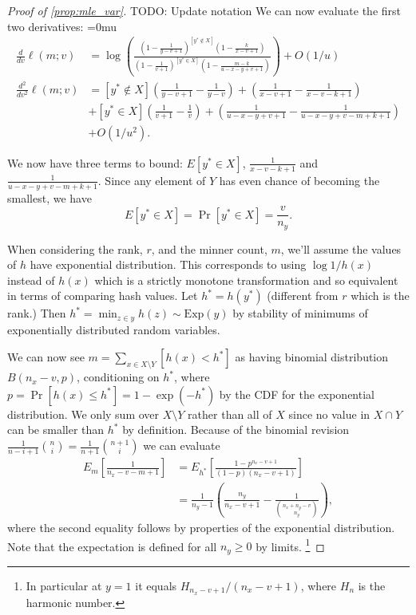 \begin{proof}[Proof of \cref{prop:mle_var}]
   TODO: Update notation
   We can now evaluate the first two derivatives:
   {
      \thinmuskip=0mu
      \begin{align}
         \frac{d}{dv}\ell(m;v)
         &=
         \log\left(\frac{(1-\frac1{y-v+1})^{[y^*\not\in X]}(1-\frac{k}{x-v+1})}{(1-\frac 1{v+1})^{[y^*\in X]}(1-\frac{m-k}{u-x-y+v+1})}\right) + O(1/u)
         \label{eq:deriv1}
         \\
         \frac{d^2}{dv^2}\ell(m;v)
        &=
          [y^*\not\in X](\tfrac1{y-v+1}-\tfrac1{y-v})
         + (\tfrac1{x-v+1}-\tfrac1{x-v-k+1})
      \\&+[y^*\in X](\tfrac1{v+1}-\tfrac1{v})
         + (\tfrac1{u-x-y+v+1}-\tfrac1{u-x-y+v-m+k+1})
      \\&+ O(1/u^2)
         \label{eq:deriv2}
         .
      \end{align}
      \vspace{-1em}
   }

   We now have three terms to bound:
   $E[y^* \in X]$, $\tfrac1{x-v-k+1}$ and $\tfrac1{u-x-y+v-m+k+1}$.
   Since any element of $Y$ has even chance of becoming the smallest, we have 
   \[E[y^*\in X] = \Pr[y^*\in X] = \frac{v}{n_y}. \]

   When considering the rank, $r$, and the minner count, $m$, we'll assume the values of $h$ have exponential distribution.
   This corresponds to using $\log1/h(x)$ instead of $h(x)$ which is a strictly monotone transformation and so equivalent in terms of comparing hash values.
   Let $h^* = h(y^*)$ (different from $r$ which is the rank.)
   Then $h^* = \min_{z\in y}h(z) \sim \text{Exp}(y)$ by stability of minimums of exponentially distributed random variables.

   We can now see $m=\sum_{x\in X\setminus Y} [h(x) < h^*]$ as having binomial distribution $B(n_x-v, p)$, conditioning on $h^*$, where $p=\Pr[h(x)\le h^*] = 1-\exp(-h^*)$ by the CDF for the exponential distribution.
   We only sum over $X\setminus Y$ rather than all of $X$ since no value in $X\cap Y$ can be smaller than $h^*$ by definition.
   Because of the binomial revision
   $\frac1{n-i+1}\binom{n}{i} = \frac1{n+1}\binom{n+1}{i}$
   we can evaluate
   \begin{align}
      E_m\left[\tfrac1{n_x-v-m+1}\right]
      &= E_{h^*}\left[\tfrac{1-p^{n_x-v+1}}{(1-p)(n_x-v+1)}\right]
    \\&= \tfrac1{n_y-1}\left(\tfrac{n_y}{n_x-v+1} - \tfrac1{\binom{n_x+n_y-v}{n_y}}\right),
   \end{align}
   where the second equality follows by properties of the exponential distribution.
   Note that the expectation is defined for all $n_y\ge 0$ by limits.%
   \footnote{In particular at $y=1$ it equals $H_{n_x-v+1}/(n_x-v+1)$, where $H_n$ is the harmonic number.}


\end{proof}

